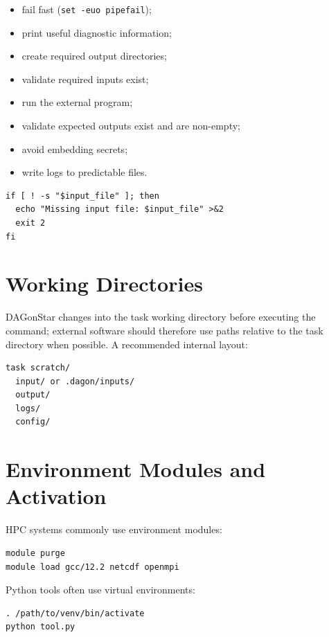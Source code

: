 \begin{itemize}[leftmargin=1.4em]
  \item fail fast (\texttt{set -euo pipefail});
  \item print useful diagnostic information;
  \item create required output directories;
  \item validate required inputs exist;
  \item run the external program;
  \item validate expected outputs exist and are non-empty;
  \item avoid embedding secrets;
  \item write logs to predictable files.
\end{itemize}

\begin{lstlisting}[style=bash, caption={A representative input-validation block.}]
if [ ! -s "$input_file" ]; then
  echo "Missing input file: $input_file" >&2
  exit 2
fi
\end{lstlisting}

\section{Working Directories}

DAGonStar changes into the task working directory before executing the
command; external software should therefore use paths relative to the task
directory when possible. A recommended internal layout:

\begin{lstlisting}[style=bash]
task scratch/
  input/ or .dagon/inputs/
  output/
  logs/
  config/
\end{lstlisting}

\section{Environment Modules and Activation}

HPC systems commonly use environment modules:

\begin{lstlisting}[style=bash]
module purge
module load gcc/12.2 netcdf openmpi
\end{lstlisting}

Python tools often use virtual environments:

\begin{lstlisting}[style=bash]
. /path/to/venv/bin/activate
python tool.py
\end{lstlisting}


